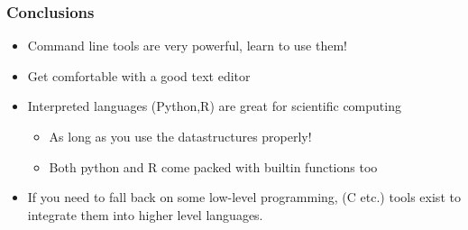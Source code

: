 \documentclass[landscape,10pt]{beamer}
\begin{document}
\begin{frame}[fragile]
\frametitle{Conclusions}
\begin{itemize}
\item Command line tools are very powerful, learn to use them!
\item Get comfortable with a good text editor
\item Interpreted languages (Python,R) are great for scientific computing
\begin{itemize}
\item As long as you use the datastructures properly!
\item Both python and R come packed with builtin functions too
\end{itemize}
\item If you need to fall back on some low-level programming, (C etc.) tools exist to integrate them into higher level languages.
\end{itemize}


\end{frame}


\end{document}
